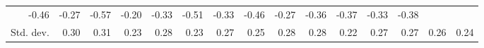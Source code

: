 \begin{tabular}{lllllllllllllll}
  \multicolumn{1}{r}{-0.46} &
  \multicolumn{1}{r}{-0.27} &
  \multicolumn{1}{r}{-0.57} &
  \multicolumn{1}{r}{-0.20} &
  \multicolumn{1}{r}{-0.33} &
  \multicolumn{1}{r}{-0.51} &
  \multicolumn{1}{r}{-0.33} &
  \multicolumn{1}{r}{-0.46} &
  \multicolumn{1}{r}{-0.27} &
  \multicolumn{1}{r}{-0.36} &
  \multicolumn{1}{r}{-0.37} &
  \multicolumn{1}{r}{-0.33} &
  \multicolumn{1}{r}{-0.38} \\
\multicolumn{1}{l}{\hspace{2em}Std. dev.} &
  \multicolumn{1}{|r}{0.30} &
  \multicolumn{1}{r}{0.31} &
  \multicolumn{1}{r}{0.23} &
  \multicolumn{1}{r}{0.28} &
  \multicolumn{1}{r}{0.23} &
  \multicolumn{1}{r}{0.27} &
  \multicolumn{1}{r}{0.25} &
  \multicolumn{1}{r}{0.28} &
  \multicolumn{1}{r}{0.28} &
  \multicolumn{1}{r}{0.22} &
  \multicolumn{1}{r}{0.27} &
  \multicolumn{1}{r}{0.27} &
  \multicolumn{1}{r}{0.26} &
  \multicolumn{1}{r}{0.24} \\
\cline{1-15}
\end{tabular}
